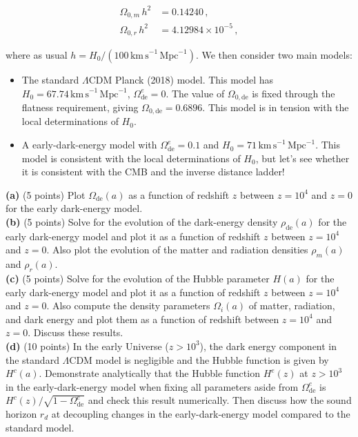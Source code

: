 \documentclass[12pt]{article}
\begin{document}
\begin{align}
    \Omega_{0,m}\,h^2 & = 0.14240\,,\\
    \Omega_{0,r}\,h^2 & = 4.12984\times 10^{-5}\,,
\end{align}

where as usual $h=H_0/(100\,\mathrm{km\,s}^{-1}\,\mathrm{Mpc}^{-1})$. We then consider two main models:

\begin{itemize}
    \item The standard $\Lambda$CDM Planck (2018) model. This model has $H_0 = 67.74\,\mathrm{km\,s}^{-1}\,\mathrm{Mpc}^{-1}$, $\Omega^e_{\mathrm{de}} = 0$. The value of $\Omega_{0,\mathrm{de}}$ is fixed through the flatness requirement, giving $\Omega_{0,\mathrm{de}} = 0.6896$. This model is in tension with the local determinations of $H_0$.
    \item A early-dark-energy model with $\Omega^e_\mathrm{de} = 0.1$ and $H_0 = 71\,\mathrm{km\,s}^{-1}\,\mathrm{Mpc}^{-1}$. This model is consistent with the local determinations of $H_0$, but let's see whether it is consistent with the CMB and the inverse distance ladder!
\end{itemize}

{\bf (a)} (5 points) Plot $\Omega_\mathrm{de}(a)$ as a function of redshift $z$ between 
$z=10^4$ and $z=0$ for the early dark-energy model.\\

{\bf (b)} (5 points) Solve for the evolution of the dark-energy density $\rho_\mathrm{de}(a)$ 
for the early dark-energy model and plot it as a function of redshift $z$ between $z=10^4$
and $z=0$. Also plot the evolution of the matter and radiation densities $\rho_m(a)$ 
and $\rho_r(a)$.\\

{\bf (c)} (5 points) Solve for the evolution of the Hubble parameter $H(a)$ for the early dark-energy 
model and plot it as a function of redshift $z$ between $z=10^4$ and $z=0$. Also compute 
the density parameters $\Omega_i(a)$ of matter, radiation, and dark energy 
and plot them as a function of redshift between $z=10^4$ and $z=0$. Discuss these results.\\

{\bf (d)} (10 points) In the early Universe ($z>10^3$), the dark energy component in the standard 
$\Lambda$CDM model is negligible and the Hubble function is given by $H^c(a)$. Demonstrate 
analytically that the Hubble function $H^e(z)$ at $z > 10^3$ in the early-dark-energy model 
when fixing all parameters aside from $\Omega^e_\mathrm{de}$
is $H^c(z)/\sqrt{1-\Omega^e_\mathrm{de}}$ and check this result numerically. Then discuss 
how the sound horizon $r_d$ at decoupling changes in the early-dark-energy model compared to 
the standard model.\\
\end{document}

